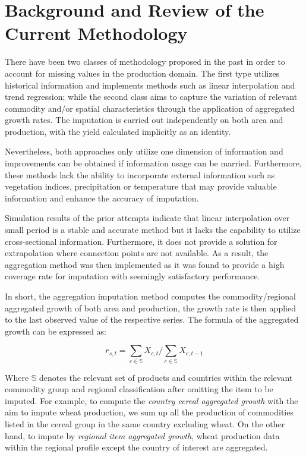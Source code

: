 \documentclass[nojss]{jss}\usepackage[]{graphicx}\usepackage[]{color}
\begin{document}
\section{Background and Review of the Current Methodology}

There have been two classes of methodology proposed in the past in
order to account for missing values in the production domain. The
first type utilizes historical information and implements methods such
as linear interpolation and trend regression; while the second class
aims to capture the variation of relevant commodity
and/or spatial characteristics through the application of
aggregated growth rates. The imputation is carried out independently
on both area and production, with the yield calculated implicitly as
an identity.

Nevertheless, both approaches only utilize one dimension of
information and improvements can be obtained if information usage
can be married. Furthermore, these methods lack the ability to
incorporate external information such as vegetation indices,
precipitation or temperature that may provide valuable information and
enhance the accuracy of imputation.

Simulation results of the prior attempts indicate that linear
interpolation over small period is a stable and accurate method but it
lacks the capability to utilize cross-sectional
information. Furthermore, it does not provide a solution for
extrapolation where connection points are not available. As a result,
the aggregation method was then implemented as it was found to provide
a high coverage rate for imputation with seemingly satisfactory
performance.

In short, the aggregation imputation method computes the
commodity/regional aggregated growth of both area and production, the
growth rate is then applied to the last observed value of the
respective series. The formula of the aggregated growth can be
expressed as:

\begin{equation}
  \label{eq:aggregateGrowth}
  r_{s, t} = \sum_{c \in \mathbb{S}} X_{c, t}/\sum_{c \in \mathbb{S}} X_{c, t-1}
\end{equation}

Where $\mathbb{S}$ denotes the relevant set of products and countries
within the relevant commodity group and regional classification after
omitting the item to be imputed. For example, to compute the
\textit{country cereal aggregated growth} with the aim to impute wheat
production, we sum up all the production of commodities listed in the
cereal group in the same country excluding wheat. On the other hand,
to impute by \textit{regional item aggregated growth}, wheat
production data within the regional profile except the country of
interest are aggregated.\\
\end{document}
